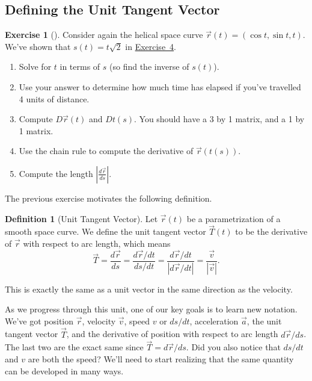 \documentclass[10pt,]{book}
\theoremstyle{plain}
\theoremstyle{definition}
\newtheorem{definition}[theorem]{Definition}
\theoremstyle{definition}
\theoremstyle{definition}
\theoremstyle{definition}
\newtheorem{exploration}[project]{Exercise}
\theoremstyle{definition}
\numberwithin{equation}{section}
\newcommand{\ds}{\displaystyle}
\begin{document}
\subsection[{Defining the Unit Tangent Vector}]{Defining the Unit Tangent Vector}\label{subsection-42}
\begin{exploration}[]\label{exploration-166}
Consider again the helical space curve \(\vec r(t)=(\cos t, \sin t, t)\). We've shown that \(s(t) = t\sqrt{2}\) in \hyperref[prob_basic_helix]{Exercise~4}.%
\begin{enumerate}[font=\bfseries,label=(\alph*),ref=\alph*]
\item\label{task-393} Solve for \(t\) in terms of \(s\) (so find the inverse of \(s(t)\)).%
\item\label{task-394} Use your answer to determine how much time has elapsed if you've travelled 4 units of distance.%
\item\label{task-395} Compute \(D\vec r(t)\) and \(Dt(s)\).  You should have a 3 by 1 matrix, and a 1 by 1 matrix.%
\item\label{task-396} Use the chain rule to compute the derivative of \(\vec r(t(s))\).%
\item\label{task-397} Compute the length \(\left|\ds\frac{d\vec r}{ds}\right|\).%
\end{enumerate}
\end{exploration}
The previous exercise motivates the following definition.%
\begin{definition}[{Unit Tangent Vector}]\label{def_unit_tangent_vector}
Let \(\vec r(t)\) be a parametrization of a smooth space curve. We define the unit tangent vector \(\vec T(t)\) to be the derivative of \(\vec r\) with respect to arc length, which means%
\begin{equation*}
\vec T = \ds\frac{d\vec r}{ds}=\ds\frac{d\vec r/dt}{ds/dt} = \frac{d\vec r/dt}{|d \vec r/dt|} = \frac{\vec v}{|\vec v|}.
\end{equation*}
%
\par
This is exactly the same as a unit vector in the same direction as the velocity.%
\end{definition}
As we progress through this unit, one of our key goals is to learn new notation. We've got position \(\vec r\), velocity \(\vec v\), speed \(v\) or \(ds/dt\), acceleration \(\vec a\), the unit tangent vector \(\vec T\), and the derivative of position with respect to arc length \(d\vec r/ds\). The last two are the exact same since \(\vec T = d\vec r/ds\). Did you also notice that \(ds/dt\) and \(v\) are both the speed? We'll need to start realizing that the same quantity can be developed in many ways.%
\end{document}
